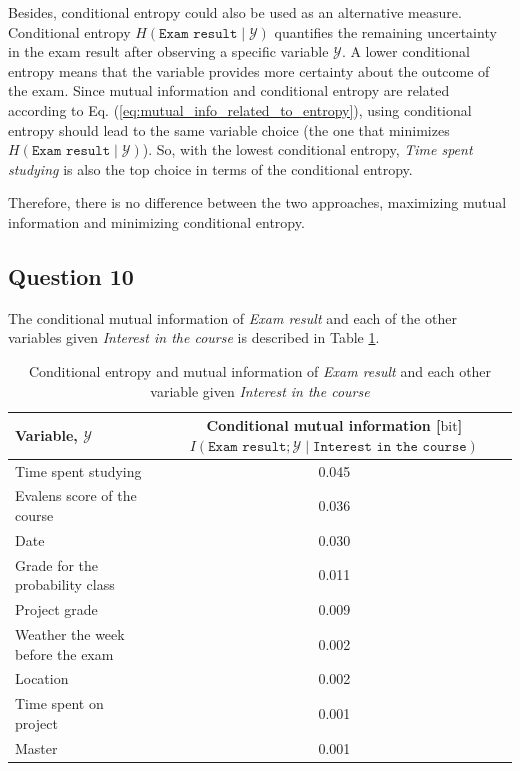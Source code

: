 \documentclass{article}
\begin{document}
Besides, conditional entropy could also be used as an alternative measure. Conditional entropy $H(\texttt{Exam result} \mid \mathcal{Y})$ quantifies the remaining uncertainty in the exam result after observing a specific variable $\mathcal{Y}$. A lower conditional entropy means that the variable provides more certainty about the outcome of the exam. Since mutual information and conditional entropy are related according to Eq. (\ref{eq:mutual_info_related_to_entropy}), using conditional entropy should lead to the same variable choice (the one that minimizes $H(\texttt{Exam result} \mid \mathcal{Y})$). So, with the lowest conditional entropy, \textit{Time spent studying} is also the top choice in terms of the conditional entropy.

Therefore, there is no difference between the two approaches, maximizing mutual information and minimizing conditional entropy.

\subsection*{Question 10}

The conditional mutual information of \textit{Exam result} and each of the other variables given \textit{Interest in the course} is described in Table \ref{tab:conditional_mutual_information}.

\begin{table}[h]
    \centering
    \footnotesize
    \caption{Conditional entropy and mutual information of \textit{Exam result} and each other variable given \textit{Interest in the course}}
    \label{tab:conditional_mutual_information}
    \begin{tabular}{lc}
        \hline
        {Variable, $\mathcal{Y}$} & \makecell{Conditional mutual information [$\mbox{bit}$] \\ $I(\texttt{Exam result}; \mathcal{Y} \mid \texttt{Interest in the course})$} \\
        \hline
        Time spent studying & 0.045 \\
        Evalens score of the course & 0.036 \\
        Date & 0.030 \\
        Grade for the probability class & 0.011 \\
        Project grade & 0.009 \\
        Weather the week before the exam & 0.002 \\
        Location & 0.002 \\
        Time spent on project & 0.001 \\
        Master & 0.001 \\
        \hline
    \end{tabular}

\end{table}
\end{document}
